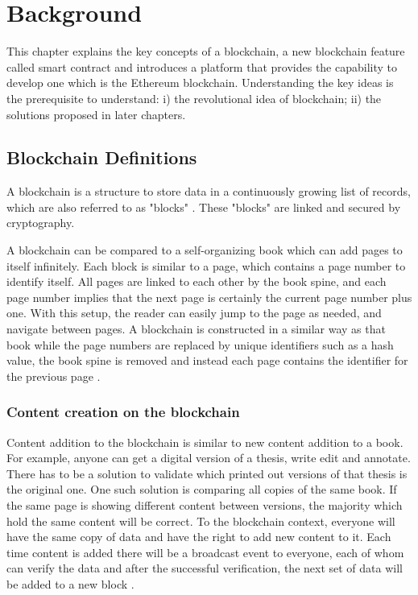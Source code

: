 \chapter{Background}
\label{ch:background}

This chapter explains the key concepts of a blockchain, a new blockchain feature called smart contract and introduces a platform that provides the capability to develop one which is the Ethereum blockchain. Understanding the key ideas is the prerequisite to understand: i) the revolutional idea of blockchain; ii) the solutions proposed in later chapters.

\section{Blockchain Definitions}

A blockchain is a structure to store data in a continuously growing list of records, which are also referred to as "blocks" \citep{RefWorks:doc:WhatIsBlockChain}. These "blocks" are linked and secured by cryptography.

A blockchain can be compared to a self-organizing book which can add pages to itself infinitely. Each block is similar to a page, which contains a page number to identify itself. All pages are linked to each other by the book spine, and each page number implies that the next page is certainly the current page number plus one. With this setup, the reader can easily jump to the page as needed, and navigate between pages. A blockchain is constructed in a similar way as that book while the page numbers are replaced by unique identifiers such as a hash value, the book spine is removed and instead each page contains the identifier for the previous page \citep{RefWorks:doc:BlockchainBasicsBook}.

\subsection{Content creation on the blockchain}
\label{contentCreationOnBlockchain}

Content addition to the blockchain is similar to new content addition to a book. For example, anyone can get a digital version of a thesis, write edit and annotate. There has to be a solution to validate which printed out versions of that thesis is the original one. One such solution is comparing all copies of the same book. If the same page is showing different content between versions, the majority which hold the same content will be correct. To the blockchain context, everyone will have the same copy of data and have the right to add new content to it. Each time content is added there will be a broadcast event to everyone, each of whom can verify the data and after the successful verification, the next set of data will be added to a new block \citep{RefWorks:doc:BitcoinWhitepaper}.

